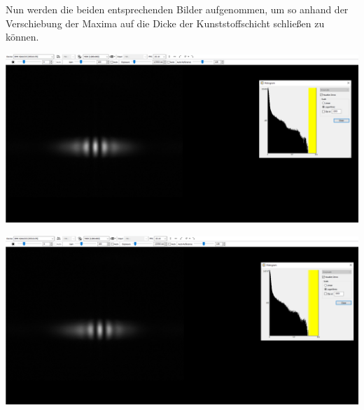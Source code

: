 \documentclass[11pt,ngerman]{scrartcl}
\begin{document}
\vspace{2mm}

\noindent Nun werden die beiden entsprechenden Bilder aufgenommen, um so anhand der Verschiebung der Maxima auf die Dicke der Kunststoffschicht schließen zu können.

\begin{center}
	\begin{minipage}[t]{\textwidth}
		\includegraphics[width=\textwidth]{Interfero/Versuch3/schicht1}
		\label{fig:substrats}
	\end{minipage}
\end{center}

\begin{center}
	\begin{minipage}[t]{\textwidth}
		\includegraphics[width=\textwidth]{Interfero/Versuch3/sprungschicht}
		\label{fig:polys}
	\end{minipage}
\end{center}
\end{document}
